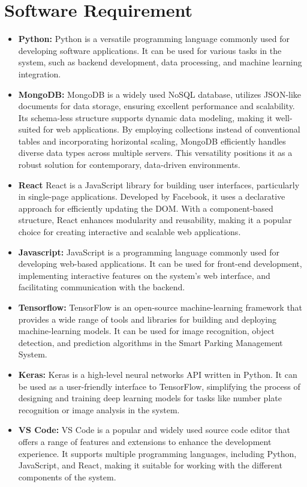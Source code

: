 \section{Software Requirement}
\begin{itemize}[noitemsep]
\item \textbf{Python:} 
Python is a versatile programming language commonly used for developing software applications. It can be used for various tasks in the system, such as backend development, data processing, and machine learning integration.
\item \textbf{MongoDB:}
MongoDB is a widely used NoSQL database, utilizes JSON-like documents for data storage, ensuring excellent performance and scalability. Its schema-less structure supports dynamic data modeling, making it well-suited for web applications. By employing collections instead of conventional tables and incorporating horizontal scaling, MongoDB efficiently handles diverse data types across multiple servers. This versatility positions it as a robust solution for contemporary, data-driven environments.
\item \textbf{React }
 React is a JavaScript library for building user interfaces, particularly in single-page applications. Developed by Facebook, it uses a declarative approach for efficiently updating the DOM. With a component-based structure, React enhances modularity and reusability, making it a popular choice for creating interactive and scalable web applications.
\item \textbf{Javascript:}
JavaScript is a programming language commonly used for developing web-based applications. It can be used for front-end development, implementing interactive features on the system’s web interface, and facilitating communication with the backend. 
\item \textbf{Tensorflow: }
TensorFlow is an open-source machine-learning framework that provides a wide range of tools and libraries for building and deploying machine-learning models. It can be used for image recognition, object detection, and prediction algorithms in the Smart Parking Management System.
\item \textbf{Keras:}
Keras is a high-level neural networks API written in Python. It can be used as a user-friendly interface to TensorFlow, simplifying the process of designing and training deep learning models for tasks like number plate recognition or image analysis in the system.
\item \textbf{VS Code:}
VS Code is a popular and widely used source code editor that offers a range of features and extensions to enhance the development experience. It supports multiple programming languages, including Python, JavaScript, and React, making it suitable for working with the different components of the system. 
\end{itemize}


